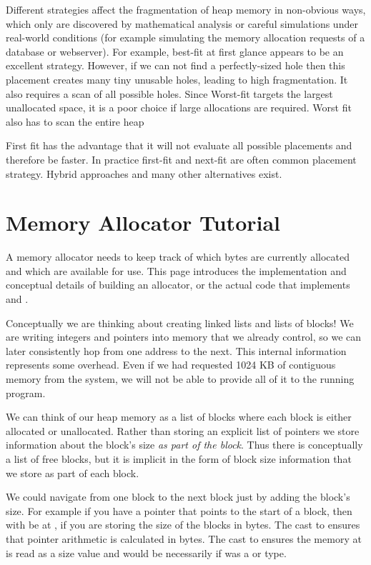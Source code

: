 Different strategies affect the fragmentation of heap memory in non-obvious ways, which only are discovered by mathematical analysis or careful simulations under real-world conditions (for example simulating the memory allocation requests of a database or webserver).
For example, best-fit at first glance appears to be an excellent strategy.
However, if we can not find a perfectly-sized hole then this placement creates many tiny unusable holes, leading to high fragmentation.
It also requires a scan of all possible holes.
Since Worst-fit targets the largest unallocated space, it is a poor choice if large allocations are required.
Worst fit also has to scan the entire heap

First fit has the advantage that it will not evaluate all possible placements and therefore be faster.
In practice first-fit and next-fit are often common placement strategy.
Hybrid approaches and many other alternatives exist.

\section{Memory Allocator Tutorial}

A memory allocator needs to keep track of which bytes are currently allocated and which are available for use.
This page introduces the implementation and conceptual details of building an allocator, or the actual code that implements  and .

Conceptually we are thinking about creating linked lists and lists of blocks!
We are writing integers and pointers into memory that we already control, so we can later consistently hop from one address to the next.
This internal information represents some overhead.
Even if we had requested 1024 KB of contiguous memory from the system, we will not be able to provide all of it to the running program.

We can think of our heap memory as a list of blocks where each block is either allocated or unallocated.
Rather than storing an explicit list of pointers we store information about the block's size \emph{as part of the block}.
Thus there is conceptually a list of free blocks, but it is implicit in the form of block size information that we store as part of each block.

We could navigate from one block to the next block just by adding the block's size.
For example if you have a pointer  that points to the start of a block, then  with be at , if you are storing the size of the blocks in bytes.
The cast to  ensures that pointer arithmetic is calculated in bytes.
The cast to  ensures the memory at  is read as a size value and would be necessarily if  was a  or  type.


